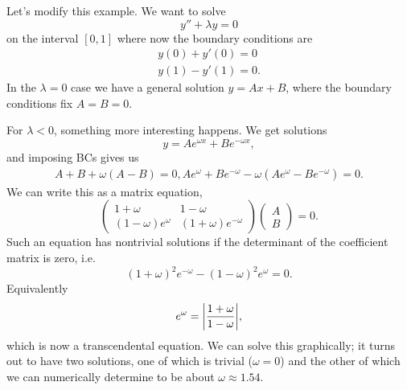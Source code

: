 \begin{exm}
    Let's modify this example. We want to solve
    \begin{equation}
        y'' + \lambda y =0
    \end{equation}
    on the interval $[0,1]$ where now the boundary conditions are
    \begin{subequations}
    \begin{align}
        y(0) + y'(0)= 0\\
        y(1) -y'(1) =0.
    \end{align}
    \end{subequations}
    In the $\lambda = 0$ case we have a general solution $y=Ax+B$, where the boundary conditions fix $A=B=0$.
    
    For $\lambda <0$, something more interesting happens. We get solutions
    \begin{equation}
        y=Ae^{\omega x} + Be^{-\omega x},
    \end{equation}
    and imposing BCs gives us
    \begin{gather}
        A+B+\omega(A-B)=0,
        Ae^\omega +Be^{-\omega} - \omega( Ae^\omega - Be^{-\omega}) = 0.
    \end{gather}
    We can write this as a matrix equation,
    \begin{equation}
        \begin{pmatrix}
            1+ \omega & 1-\omega\\
            (1-\omega)e^\omega & (1+\omega) e^{-\omega}
        \end{pmatrix}
        \begin{pmatrix}
            A\\B
        \end{pmatrix} =0.
    \end{equation}
    Such an equation has nontrivial solutions if the determinant of the coefficient matrix is zero, i.e.
    \begin{equation}
        (1+\omega)^2 e^{-\omega} - (1-\omega)^2 e^\omega =0.
    \end{equation}
    Equivalently
    \begin{equation}
        e^\omega = \abs*{\frac{1+\omega}{1-\omega}},
    \end{equation}
    which is now a transcendental equation. We can solve this graphically; it turns out to have two solutions, one of which is trivial ($\omega=0$) and the other of which we can numerically determine to be about $\omega \approx 1.54$.
    

\end{exm}
